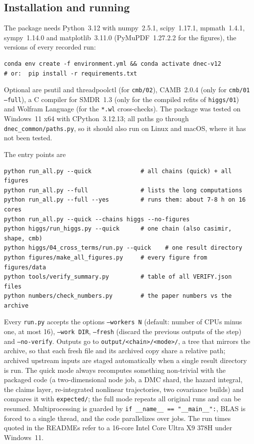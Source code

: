 \subsection{Installation and running}\label{sec:v22-run}

The package needs Python~3.12 with numpy~2.5.1, scipy~1.17.1, mpmath~1.4.1, sympy~1.14.0 and matplotlib~3.11.0 (PyMuPDF~1.27.2.2 for the figures), the versions of every recorded run:
\begin{verbatim}
conda env create -f environment.yml && conda activate dnec-v12
# or:  pip install -r requirements.txt
\end{verbatim}
Optional are psutil and threadpoolctl (for \texttt{cmb/02}), CAMB~2.0.4 (only for \texttt{cmb/01 --full}), a C compiler for SMDR~1.3 (only for the compiled refits of \texttt{higgs/01}) and Wolfram Language (for the \texttt{*.wl} cross-checks).
The package was tested on Windows~11 x64 with CPython~3.12.13; all paths go through \texttt{dnec\_common/paths.py}, so it should also run on Linux and macOS, where it has not been tested.

The entry points are
{\small
\begin{verbatim}
python run_all.py --quick              # all chains (quick) + all figures
python run_all.py --full               # lists the long computations
python run_all.py --full --yes         # runs them: about 7-8 h on 16 cores
python run_all.py --quick --chains higgs --no-figures
python higgs/run_higgs.py --quick      # one chain (also casimir, shape, cmb)
python higgs/04_cross_terms/run.py --quick    # one result directory
python figures/make_all_figures.py     # every figure from figures/data
python tools/verify_summary.py         # table of all VERIFY.json files
python numbers/check_numbers.py        # the paper numbers vs the archive
\end{verbatim}}
Every \texttt{run.py} accepts the options \texttt{--workers~N} (default: number of CPUs minus one, at most 16), \texttt{--work~DIR}, \texttt{--fresh} (discard the previous outputs of the step) and \texttt{--no-verify}.
Outputs go to \texttt{output/\allowbreak<chain>/\allowbreak<mode>/}, a tree that mirrors the archive, so that each fresh file and its archived copy share a relative path; archived upstream inputs are staged automatically when a single result directory is run.
The quick mode always recomputes something non-trivial with the packaged code (a two-dimensional node job, a DMC shard, the hazard integral, the claims layer, re-integrated nonlinear trajectories, two covariance builds) and compares it with \texttt{expected/}; the full mode repeats all original runs and can be resumed.
Multiprocessing is guarded by \texttt{if \_\_name\_\_ == "\_\_main\_\_":}, BLAS is forced to a single thread, and the code parallelizes over jobs.
The run times quoted in the READMEs refer to a 16-core Intel Core Ultra X9 378H under Windows~11.

